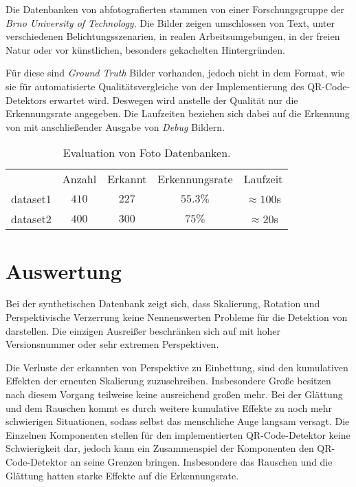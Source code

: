 \noindent Die Datenbanken von abfotografierten \QRCodes \cite{databasebrno} stammen von einer Forschungsgruppe der \emph{Brno University of Technology}. Die Bilder zeigen \QRCodes umschlossen von Text, unter verschiedenen Belichtungsszenarien, in realen Arbeitsumgebungen, in der freien Natur oder vor künstlichen, besonders gekachelten Hintergründen.

Für diese \QRCodes sind \emph{Ground Truth} Bilder vorhanden, jedoch nicht in dem Format, wie sie für automatisierte Qualitätsvergleiche von der Implementierung des QR-Code-Detektors erwartet wird. Deswegen wird anstelle der Qualität nur die Erkennungsrate angegeben. Die Laufzeiten beziehen sich dabei auf die Erkennung von \QRCodes mit anschließender Ausgabe von \emph{Debug} Bildern.

\begin{table}[h]
\centering
\begin{tabular}{l c c c c}
 		& Anzahl & Erkannt & Erkennungsrate & Laufzeit \\
		dataset1 & $410$ & $227$ & $55.3\%$ & $\approx100$s \\
		dataset2 & $400$ & $300$ & $75\%$ & $\approx20$s \\
\end{tabular}
\caption{Evaluation von Foto Datenbanken.}
\end{table}

\newpage
\section{Auswertung}
Bei der synthetischen Datenbank zeigt sich, dass Skalierung, Rotation und Perspektivische Verzerrung keine Nennenswerten Probleme für die Detektion von \QRCodes darstellen. Die einzigen Ausreißer beschränken sich auf \QRCodes mit hoher Versionsnummer oder sehr extremen Perspektiven.

Die Verluste der erkannten \QRCodes von Perspektive zu Einbettung, sind den kumulativen Effekten der erneuten Skalierung zuzuschreiben. Insbesondere Große \QRCodes besitzen nach diesem Vorgang teilweise keine ausreichend großen \fps mehr.
Bei der Glättung und dem Rauschen kommt es durch weitere kumulative Effekte zu noch mehr schwierigen Situationen, sodass selbst das menschliche Auge langsam versagt.
Die Einzelnen Komponenten stellen für den implementierten QR-Code-Detektor keine Schwierigkeit dar, jedoch kann ein Zusammenspiel der Komponenten den QR-Code-Detektor an seine Grenzen bringen. Insbesondere das Rauschen und die Glättung hatten starke Effekte auf die Erkennungsrate.

